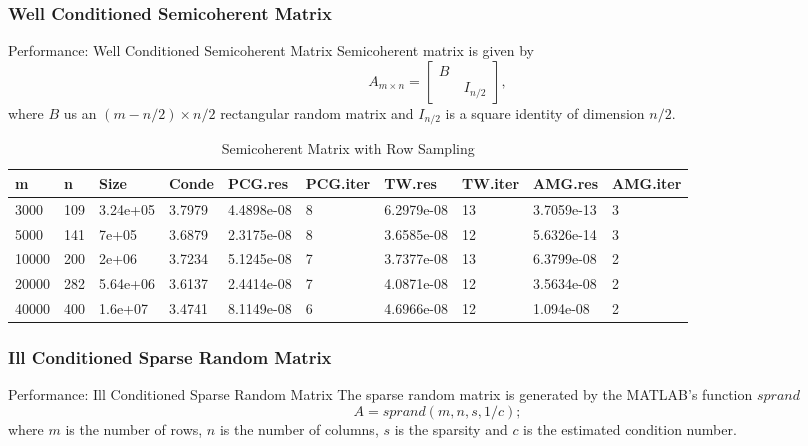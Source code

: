 \subsubsection{Well Conditioned Semicoherent Matrix}

Performance: Well Conditioned Semicoherent Matrix
\small
{Semicoherent matrix is given by
$$
A_{m \times n} =
 \begin{bmatrix}
  B & \\
    \quad & I_{n/2}
 \end{bmatrix},
$$
where $B$ us an $(m - n/2) \times n/2$ rectangular random matrix and $I_{n/2}$ is a square identity of dimension $n/2$. }


\begin{table}\label{table_semi}
\centering
\caption{Semicoherent Matrix with Row Sampling}
\begin{tabular}{| l | l | l |l |l |l |l |l |l |l |}\hline
  m & n & Size  &   Conde    &    PCG.res    &  PCG.iter    &  TW.res    &  TW.iter  &   AMG.res    &  AMG.iter\\\hline
3000& 109 &  3.24e+05 &  3.7979   & 4.4898e-08  &  8    &   6.2979e-08    &13    &  3.7059e-13   &  3   \\\hline
 5000 & 141 &    7e+05  & 3.6879   & 2.3175e-08 &   8     &  3.6585e-08    &12 &    5.6326e-14    & 3   \\\hline
  10000& 200 &     2e+06  &  3.7234   & 5.1245e-08  &  7   &    3.7377e-08 &   13   &   6.3799e-08   & 2    \\\hline
   20000& 282 &  5.64e+06  & 3.6137  &  2.4414e-08  &  7   &    4.0871e-08 &   12   &  3.5634e-08  &  2   \\\hline
   40000 & 400 & 1.6e+07   &  3.4741  &   8.1149e-08  &   6     &   4.6966e-08  & 12 &  1.094e-08 &   2  \\\hline
\end{tabular}
\end{table}


\subsubsection{Ill Conditioned Sparse Random Matrix}
Performance: Ill Conditioned Sparse Random Matrix
The sparse random matrix is generated by the MATLAB's function $sprand$
$$
 A = sprand(m,n,s,1/c);
$$
where $m$ is the number of rows, $n$ is the number of columns, $s$ is the sparsity and $c$ is the estimated condition number.
\\


